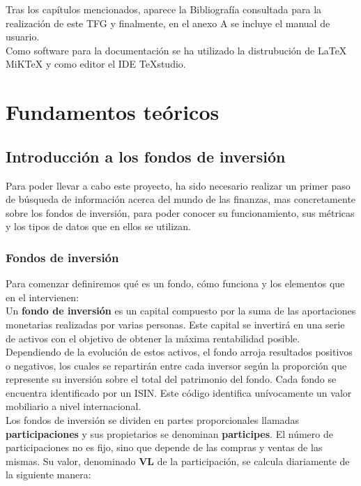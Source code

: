 \documentclass[12pt, a4paper]{book}
\begin{document}
Tras los capítulos mencionados, aparece la Bibliografía consultada para la realización de este \gls{TFG} y finalmente, en el anexo A se incluye el manual de usuario.\\

Como software para la documentación se ha utilizado la distrubución de LaTeX MiKTeX y como editor el IDE TeXstudio.

\newpage

\chapter{Fundamentos teóricos}

\section{Introducción a los fondos de inversión}

Para poder llevar a cabo este proyecto, ha sido necesario realizar un primer paso de búsqueda de información acerca del mundo de las finanzas, mas concretamente sobre los fondos de inversión, para poder conocer su funcionamiento, sus métricas y los tipos de datos que en ellos se utilizan.\\

\subsection{Fondos de inversión}

Para comenzar definiremos qué es un fondo, cómo funciona y los elementos que en el intervienen:\\

Un \textbf{fondo de inversión} es un capital compuesto por la suma de las aportaciones monetarias realizadas por varias personas. Este capital se invertirá en una serie de activos con el objetivo de obtener la máxima rentabilidad posible. Dependiendo de la evolución de estos activos, el fondo arroja resultados positivos o negativos, los cuales se repartirán entre cada inversor según la proporción que represente su inversión sobre el total del patrimonio del fondo. Cada fondo se encuentra identificado por un \gls{ISIN}. Este código identifica unívocamente un valor mobiliario a nivel internacional.\\

Los fondos de inversión se dividen en partes proporcionales llamadas \textbf{participaciones} y sus propietarios se denominan \textbf{participes}. El número de participaciones no es fijo, sino que depende de las compras y ventas de las mismas. Su valor, denominado \textbf{\gls{VL}} de la participación, se calcula diariamente de la siguiente manera: 
	
\end{document}
